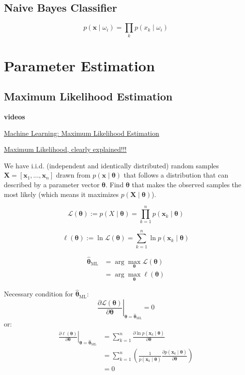 \documentclass{article}
\begin{document}
\begin{multicols}{2}
\subsection{Naive Bayes Classifier}
\[p(\symbf{x} \mid \omega_i) = \prod_{k} p(x_k \mid \omega_i)\]


\section{Parameter Estimation}

\subsection{Maximum Likelihood Estimation}
\begin{mdframed}
	\textbf{videos}

	\href{https://www.youtube.com/watch?v=sguol03tfWo&list=PL5yR0euE9N2kGEf7gqysMFq0Spoq0evNf&index=2}{Machine Learning: Maximum Likelihood Estimation}

	\href{https://www.youtube.com/watch?v=XepXtl9YKwc}{Maximum Likelihood, clearly explained!!!}
\end{mdframed}

We have i.i.d. (independent and identically distributed) random samples $\symbf{X} = [\symbf{x}_1, \ldots, \symbf{x}_n]$ drawn from $p(\symbf{x} \mid \symbf{\theta})$ that follows a distribution that can described by a parameter vector $\symbf{\theta}$.
Find $\symbf{\theta}$ that makes the observed samples the most likely (which means it maximizes $p(\symbf{X} \mid \symbf{\theta})$).

\[\mathcal{L}(\symbf{\theta}) := p(X \mid \symbf{\theta}) = \prod_{k=1}^{n} p(\symbf{x}_k \mid \symbf{\theta})\]

\[\ell(\symbf{\theta}) := \ln \mathcal{L}(\symbf{\theta}) = \sum_{k=1}^n \ln p(\symbf{x}_k \mid \symbf{\theta})\]

\[\begin{split}
	\symbf{\hat \theta}_{\text{ML}} &= \arg\max_{\symbf{\theta}} \mathcal{L}(\symbf{\theta}) \\
	&= \arg\max_{\symbf{\theta}} \ell(\symbf{\theta})
\end{split}\]

Necessary condition for $\symbf{\hat \theta}_{\text{ML}}$:
\[\left. \frac{\partial \mathcal{L}(\symbf{\theta})}{\partial \symbf{\theta}} \right|_{\symbf{\theta} = \symbf{\hat \theta}_{\text{ML}}} = 0\]
or:
\[\begin{split}
	\left. \frac{\partial \ell(\symbf{\theta})}{\partial \symbf{\theta}} \right|_{\symbf{\theta} = \symbf{\hat \theta}_{\text{ML}}} &= \sum_{k=1}^n \frac{\partial \ln p(\symbf{x}_k \mid \symbf{\theta})}{\partial \symbf{\theta}} \\
	&= \sum_{k=1}^n \left( \frac{1}{p(\symbf{x}_k \mid \symbf{\theta})} \frac{\partial p(\symbf{x}_k \mid \symbf{\theta})}{\partial \symbf{\theta}} \right) \\
	&= 0
\end{split}\]


\end{multicols}
\end{document}

